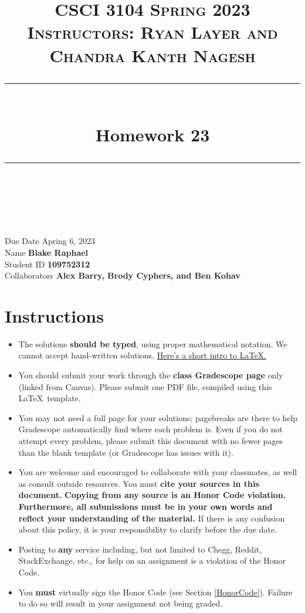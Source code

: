 \documentclass[11pt]{article}
\title{
\normalfont \normalsize
\textsc{CSCI 3104 Spring 2023 \\
Instructors: Ryan Layer and Chandra Kanth Nagesh} \\
[10pt]
\rule{\linewidth}{0.5pt} \\[6pt]
\huge Homework 23 \\
\rule{\linewidth}{2pt}  \\[10pt]
}
\author{}
\date{}
\theoremstyle{definition}
\theoremstyle{definition}
\theoremstyle{definition}
\begin{document}

\maketitle


\noindent
Due Date \dotfill Apring 6, 2023 \\
Name \dotfill \textbf{Blake Raphael} \\
Student ID \dotfill \textbf{109752312} \\
Collaborators \dotfill \textbf{Alex Barry, Brody Cyphers, and Ben Kohav}

\tableofcontents

\section{Instructions}
 \begin{itemize}
	\item The solutions \textbf{should be typed}, using proper mathematical notation. We cannot accept hand-written solutions. \href{http://ece.uprm.edu/~caceros/latex/introduction.pdf}{Here's a short intro to \LaTeX.}
	\item You should submit your work through the \textbf{class Gradescope page} only (linked from Canvas). Please submit one PDF file, compiled using this \LaTeX \ template.
	\item You may not need a full page for your solutions; pagebreaks are there to help Gradescope automatically find where each problem is. Even if you do not attempt every problem, please submit this document with no fewer pages than the blank template (or Gradescope has issues with it).

	\item You are welcome and encouraged to collaborate with your classmates, as well as consult outside resources. You must \textbf{cite your sources in this document.} \textbf{Copying from any source is an Honor Code violation. Furthermore, all submissions must be in your own words and reflect your understanding of the material.} If there is any confusion about this policy, it is your responsibility to clarify before the due date. 

	\item Posting to \textbf{any} service including, but not limited to Chegg, Reddit, StackExchange, etc., for help on an assignment is a violation of the Honor Code.

	\item You \textbf{must} virtually sign the Honor Code (see Section \ref{HonorCode}). Failure to do so will result in your assignment not being graded.
\end{itemize}
\end{document}
